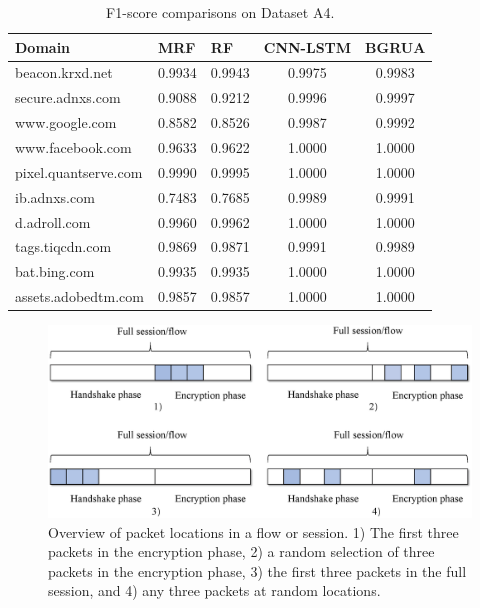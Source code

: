 \documentclass[preprint,12pt]{elsarticle}
\begin{document}
\begin{table}[]
\caption{F1-score comparisons on Dataset A4.}
\centering
\label{tab9}
\begin{tabular}{lllcc}
\hline
\textbf{Domain}      & \textbf{MRF} & \textbf{RF} & \textbf{CNN-LSTM} & \textbf{BGRUA} \\ \hline
beacon.krxd.net      & 0.9934       & 0.9943      & 0.9975            & 0.9983        \\
secure.adnxs.com     & 0.9088       & 0.9212      & 0.9996            & 0.9997        \\
www.google.com       & 0.8582       & 0.8526      & 0.9987            & 0.9992        \\
www.facebook.com     & 0.9633       & 0.9622      & 1.0000            & 1.0000        \\
pixel.quantserve.com & 0.9990       & 0.9995      & 1.0000            & 1.0000        \\
ib.adnxs.com         & 0.7483       & 0.7685      & 0.9989            & 0.9991        \\
d.adroll.com         & 0.9960       & 0.9962      & 1.0000            & 1.0000        \\
tags.tiqcdn.com      & 0.9869       & 0.9871      & 0.9991            & 0.9989        \\
bat.bing.com         & 0.9935       & 0.9935      & 1.0000            & 1.0000        \\
assets.adobedtm.com  & 0.9857       & 0.9857      & 1.0000            & 1.0000        \\ \hline
\end{tabular}
\end{table}







\begin{figure}[]
\includegraphics[width=\textwidth]{pktloc.eps}
\caption{Overview of packet locations in a flow or session. 1) The first three packets in the encryption phase, 2) a random selection of three packets in the encryption phase, 3) the first three packets in the full session, and 4) any three packets at random locations.}\label{fig6}
\end{figure}
\end{document}
